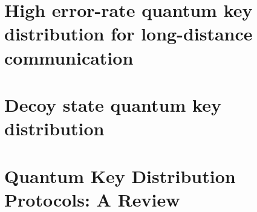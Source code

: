 \subsection*{\dic}
\blindtext
\section{High error-rate quantum key distribution for long-distance communication }
\blindtext
\subsection*{\trnas}
\blindtext
\subsection*{\review}
\blindtext
\subsection*{\dic}
\blindtext
\section{Decoy state quantum key distribution}
\blindtext
\subsection*{\trnas}
\blindtext
\subsection*{\review}
\blindtext
\subsection*{\dic}
\blindtext
\section{Quantum Key Distribution Protocols: A Review}
\blindtext
\subsection*{\trnas}
\blindtext
\subsection*{\review}
\blindtext
\subsection*{\dic}
\blindtext
